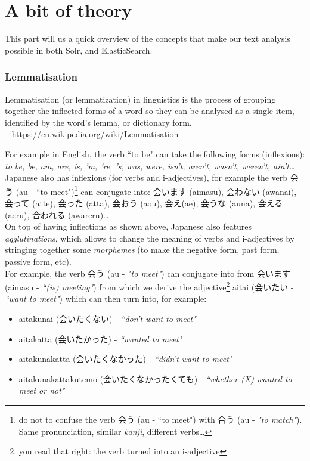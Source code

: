

\renewcommand{\currentPart}{A bit of theory}
\part{\currentPart} \label{part - A bit of theory}

This part will us a quick overview of the concepts that make our text analysis possible in both Solr, and ElasticSearch.


\section{Lemmatisation} \label{lemmatisation}

\begin{displayquote}
Lemmatisation (or lemmatization) in linguistics is the process of grouping together the inflected forms of a word so they can be analysed as a single item, identified by the word's lemma, or dictionary form. \\
\phantom{.} \hfill -- \url{https://en.wikipedia.org/wiki/Lemmatisation}
\end{displayquote}
\bigskip

For example in English, the verb ``to be" can take the following forms (inflexions): \emph{to be, be, am, are, is, 'm, 're, 's, was, were, isn't, aren't, wasn't, weren't, ain't\dots} \\

Japanese also has inflexions (for verbs and i-adjectives), for example the verb 会う (au - ``to meet")\footnote{do not to confuse the verb 会う (au - ``to meet") with 合う (au - \emph{"to match"}). Same pronunciation, similar \emph{kanji}, different verbs\dots} can conjugate into: 会います (aimasu), 会わない (awanai), 会って (atte), 会った (atta), 会おう (aou), 会え(ae), 会うな (auna), 会える (aeru), 合われる (awareru)\dots\\

On top of having inflections as shown above, Japanese also features \emph{agglutinations}, which allows to change the meaning of verbs and i-adjectives by stringing together some \emph{morphemes} (to make the negative form, past form, passive form, etc). \\

For example, the verb 会う (au - \emph{"to meet"}) can conjugate into from 会います (aimasu - \emph{``(is) meeting"}) from which we derive the adjective\footnote{you read that right: the verb turned into an i-adjective} aitai (会いたい - \emph{``want to meet"}) which can then turn into, for example:
\begin{itemize}
	\item aitakunai (会いたくない) - \emph{``don't want to meet"}
	\item aitakatta (会いたかった) - \emph{``wanted to meet"}
	\item aitakunakatta (会いたくなかった) - \emph{``didn't want to meet"}
	\item aitakunakattakutemo (会いたくなかったくても) - \emph{``whether (X) wanted to meet or not"}
\end{itemize}

